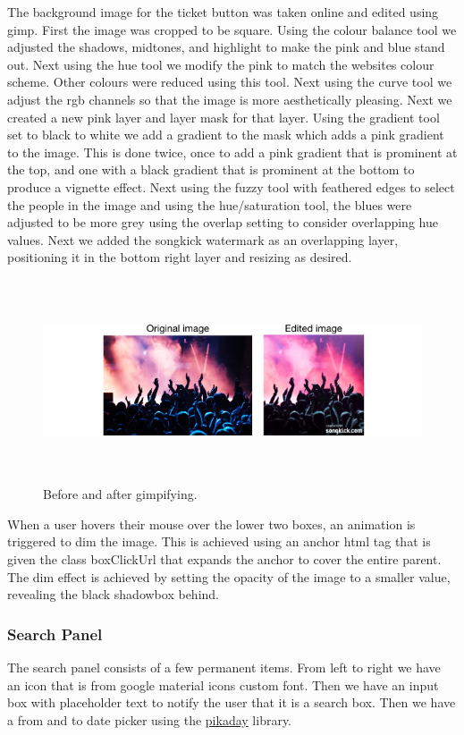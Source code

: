 \documentclass[10pt]{article}
\begin{document}
                The background image for the ticket button was taken online and edited using gimp. First the image was cropped to be square. Using the colour balance tool we adjusted the shadows, midtones, and highlight to make the pink and blue stand out. Next using the hue tool we modify the pink to match the websites colour scheme. Other colours were reduced using this tool. Next using the curve tool we adjust the rgb channels so that the image is more aesthetically pleasing. Next we created a new pink layer and layer mask for that layer. Using the gradient tool set to black to white we add a gradient to the mask which adds a pink gradient to the image. This is done twice, once to add a pink gradient that is prominent at the top, and one with a black gradient that is prominent at the bottom to produce a vignette effect. Next using the fuzzy tool with feathered edges to select the people in the image and using the hue/saturation tool, the blues were adjusted to be more grey using the overlap setting to consider overlapping hue values. Next we added the songkick watermark as an overlapping layer, positioning it in the bottom right layer and resizing as desired.

                \begin{figure}[!ht]
                  \centering
                      \includegraphics[height=60mm]{example2.png}
                  \caption{Before and after gimpifying.}
                \end{figure}


                When a user hovers their mouse over the lower two boxes, an animation is triggered to dim the image. This is achieved using an anchor html tag that is given the class boxClickUrl that expands the anchor to cover the entire parent. The dim effect is achieved by setting the opacity of the image to a smaller value, revealing the black shadowbox behind.

            \subsubsection{Search Panel}
                The search panel consists of a few permanent items. From left to right we have an icon that is from google material icons custom font. Then we have an input box with placeholder text to notify the user that it is a search box. Then we have a from and to date picker using the \href{https://github.com/dbushell/Pikaday}{pikaday} library.
\end{document}

